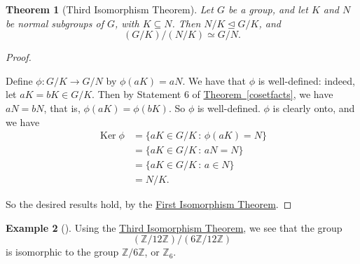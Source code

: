\documentclass[10pt,]{book}
\theoremstyle{plain}
\newtheorem{theorem}{Theorem}[section]
\theoremstyle{definition}
\theoremstyle{definition}
\theoremstyle{definition}
\newtheorem{example}[theorem]{Example}
\theoremstyle{definition}
\numberwithin{equation}{section}
\def\Z{\mathbb{Z}}
\DeclareMathOperator{\Ker}{Ker}
\newcommand{\amp}{&}
\begin{document}
\begin{theorem}[{Third Isomorphism Theorem}]\label{tit}
Let \(G\) be a group, and let \(K\) and \(N\) be normal subgroups of \(G\), with \(K\subseteq N\). Then \(N/K \unlhd G/K\), and%
\begin{equation*}
(G/K)/(N/K)\simeq G/N.
\end{equation*}
%
\end{theorem}
\begin{proof}\hypertarget{proof-60}{}
Define \(\phi: G/K\to G/N\) by \(\phi(aK)=aN\). We have that \(\phi\) is well-defined: indeed, let \(aK=bK \in G/K\). Then by Statement 6 of \hyperref[cosetfacts]{Theorem~\ref{cosetfacts}}, we have \(aN=bN\), that is, \(\phi(aK)=\phi(bK)\). So \(\phi\) is well-defined. \(\phi\) is clearly onto, and we have%
\begin{align*}
\Ker \phi\amp =\{aK\in
G/K\,:\,\phi(aK)=N\}\\
\amp =\{aK\in G/K\,:\,aN=N\}\\
\amp =\{aK\in
G/K\,:\,a\in N\}\\
\amp =N/K.
\end{align*}
%
\par
So the desired results hold, by the \hyperref[fit]{First Isomorphism Theorem}.%
\end{proof}
\begin{example}[]\label{example-88}
Using the \hyperref[tit]{Third Isomorphism Theorem}, we see that the group%
\begin{equation*}
(\Z/12\Z)/(6\Z/12\Z)
\end{equation*}
is isomorphic to the group \(\Z/6\Z\), or \(\Z_6\).%
\end{example}
\typeout{************************************************}
\typeout{************************************************}
\end{document}
